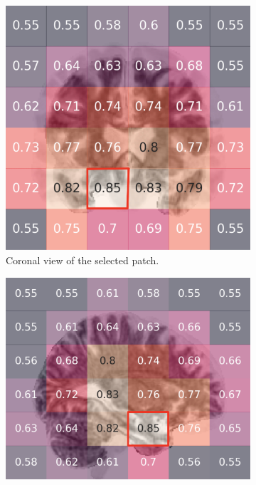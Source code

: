 \documentclass{article}
\begin{document}
\begin{figure}[htb]
  \centering
  \begin{subfigure}{0.32\textwidth}
    \includegraphics[width=\textwidth]{figures/perf_coronal.png}
    \caption{Coronal view of the selected patch.}
  \end{subfigure}
  \hfill
  \begin{subfigure}{0.32\textwidth}
    \includegraphics[width=\textwidth]{figures/perf_saggital.png}

\end{subfigure}
\end{figure}
\end{document}
